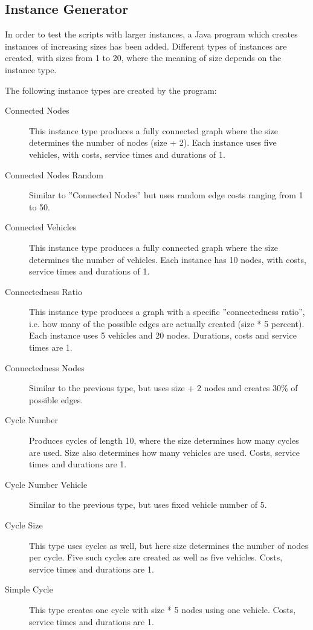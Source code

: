 \documentclass[12pt, letterpaper]{article}
\begin{document}
\subsection{Instance Generator}
In order to test the scripts with larger instances, a Java program which creates instances of increasing sizes has been added. Different types of instances are created, with sizes from 1 to 20, where the meaning of size depends on the instance type.

The following instance types are created by the program:
\begin{description}

\item[Connected Nodes]
This instance type produces a fully connected graph where the size determines the number of nodes (size + 2). Each instance uses five vehicles, with costs, service times and durations of 1.

\item[Connected Nodes Random]
Similar to ''Connected Nodes'' but uses random edge costs ranging from 1 to 50.

\item[Connected Vehicles]
This instance type produces a fully connected graph where the size determines the number of vehicles. Each instance has 10 nodes, with costs, service times and durations of 1.

\item[Connectedness Ratio]
This instance type produces a graph with a specific ''connectedness ratio'', i.e. how many of the possible edges are actually created (size * 5 percent). Each instance uses 5 vehicles and 20 nodes. Durations, costs and service times are 1.

\item[Connectedness Nodes]
Similar to the previous type, but uses size + 2 nodes and creates 30\% of possible edges.

\item[Cycle Number]
Produces cycles of length 10, where the size determines how many cycles are used. Size also determines how many vehicles are used. Costs, service times and durations are 1.

\item[Cycle Number Vehicle]
Similar to the previous type, but uses fixed vehicle number of 5.

\item[Cycle Size]
This type uses cycles as well, but here size determines the number of nodes per cycle. Five such cycles are created as well as five vehicles. Costs, service times and durations are 1.

\item[Simple Cycle]
This type creates one cycle with size * 5 nodes using one vehicle. Costs, service times and durations are 1.

\end{description}
\end{document}

